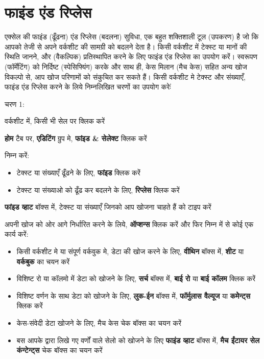 \section{फाइंड एंड रिप्लेस}\label{id-1.36}

एक्सेल की फाइंड (ढूँढना) एंड रिप्लेस (बदलना) सुविधा, एक बहुत शक्तिशाली टूल (उपकरण) है जो कि आपको तेजी से अपने वर्कशीट की सामग्री को बदलने देता है। किसी वर्कशीट में टेक्स्ट या मानों की स्थिति जानने, और (वैकल्पिक) प्रतिस्थापित करने के लिए फाइंड एंड रिप्लेस का उपयोग करें। स्वरूपण (फॉर्मेटिंग) को निर्दिष्ट (स्पेसिफ्यिंग) करके और साथ ही, केस मिलान (मैच केस) सहित अन्य खोज विकल्पो से, आप खोज परिणामों को संकुचित कर सकते हैं। किसी वर्कशीट मे टेक्स्ट और संख्याएँ, फाइंड एंड रिप्लेस करने के लिये निम्नलिखित चरणों का उपयोग करेःं

\begin{descriptionSimple}{चरण 1:}
\item[चरण 1] वर्कशीट में, किसी भी सेल पर क्लिक करें
\item[चरण 2] \textbf{होम} टैब पर, \textbf{एडिटिंग} ग्रुप मे, \textbf{फांइड \& सेलेक्ट} क्लिक करें
\item[चरण 3] निम्न करें:
		\begin{itemize}	
		\item टेक्स्ट या संख्याएँ ढूँढने के लिए, \textbf{फांइड} क्लिक करें
		\item टेक्स्ट या संख्याओ को ढूँढ कर बदलने के लिए, \textbf{रिप्लेस} क्लिक करें
		\end{itemize}
\item[चरण 4] \textbf{फांइड व्हाट} बॉक्स में, टेक्स्ट या संख्याएँ जिनको आप खोजना चाहते हैं को टाइप करें
\item[चरण 5] अपनी खोज को ओर आगे निर्धारित करने के लिये, \textbf{ऑप्शन्स} क्लिक करें और फिर निम्न में से कोई एक कार्य करें:
		\begin{itemize}	
		\item किसी वर्कशीट मे या संपूर्ण वर्कवुक मे, डेटा की खोज करने के लिए, \textbf{वीथिन} बॉक्स में, \textbf{शीट} या \textbf{वर्कबुक} का चयन करें
		\item विशिष्ट रो या कॉलमो में डेटा को खोजने के लिए, \textbf{सर्च} बॉक्स में, \textbf{बाई रो} या \textbf{बाई कॉलम} क्लिक करें
		\item विशिष्ट वर्णन के साथ डेटा को खोजने के लिए, \textbf{लुक-ईन} बॉक्स में, \textbf{फॉर्मुलास वैल्यूज} या \textbf{कमेेन्ट्स} क्लिक करें
		\item केस-संवेदी डेटा खोजने के लिए, मैच केस चेक बॉक्स का चयन करें	
		\item बस आपके द्वारा लिखे गए वर्णों वाले सेलो को खोजने के लिए \textbf{फाइंड व्हाट} बॉक्स में, \textbf{मैच ईंटायर सेल कंन्टेन्ट्स} चेक बॉक्स का चयन करें
		\end{itemize}
\end{descriptionSimple}					
